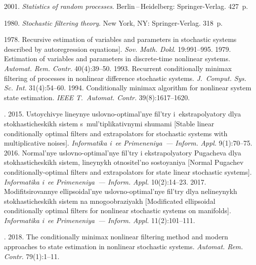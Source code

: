   \begin{multicols}{2}

\renewcommand{\bibname}{\protect\rmfamily References}

{\small\frenchspacing
 {%
 \begin{thebibliography}{99}

 2001. \textit{Statistics of random processes}. 
Berlin\,--\,Heidelberg: Springer-Verlag. 427~p.

 1980. \textit{Stochastic filtering theory}. New York, NY: 
Springer-Verlag. 318~p.

 1978. 
Recursive estimation of variables and parameters in stochastic systems described by 
autoregression equations]. \textit{Sov. Math.
Dokl}. 19:991--995.
 1979. Estimation of variables and parameters in 
discrete-time nonlinear systems. \textit{Automat. Rem. Contr.} 40(4):39--50.
 1993. Recurrent conditionally minimax filtering of 
processes in nonlinear difference stochastic systems. 
\textit{J.~Comput. Sys. Sc. Int.} 31(4):54--60.
 1994. Conditionally minimax algorithm 
for nonlinear system state estimation. \textit{IEEE T.~Automat. Contr.} 39(8):1617--1620.

. 2015. Ustoychivye lineynye
     uslovno-optimal'nye fil'try i~ekstrapolyatory dlya stokhasticheskikh sistem 
     s~mul'tiplikativnymi shumami [Stable linear conditionally optimal filters and 
extrapolators for stochastic systems with multiplicative noises]. \textit{Informatika i~ee 
Primeneniya~--- Inform. Appl.} 9(1):70--75. 
 2016. Normal'nye uslovno-optimal'nye 
fil'try i ekstrapolyatory Pugacheva dlya stokhasticheskikh sistem, 
lineynykh otnositel'no so\-sto\-yaniya [Normal Pugachev conditionally-optimal filters 
and extrapolators for state linear stochastic systems]. \textit{Informatika i~ee Primeneniya~--- 
Inform. Appl.} 10(2):14--23. 
 2017. 
Modifitsirovannye ellipsoidal'nye uslovno-optimal'nye fil'try dlya nelineynykh 
stokhasticheskikh sistem na mnogoobraziyakh [Modificated ellipsoidal conditionally 
optimal filters for nonlinear stochastic systems on manifolds]. \textit{Informatika i~ee 
Primeneniya~--- Inform. Appl.} 11(2):101--111.

. 
2018. The conditionally minimax nonlinear filtering method and modern 
approaches to state estimation in nonlinear stochastic systems. \textit{Automat. Rem. 
Contr.} 79(1):1--11.
\end{thebibliography}

 }
 }

\end{multicols}


